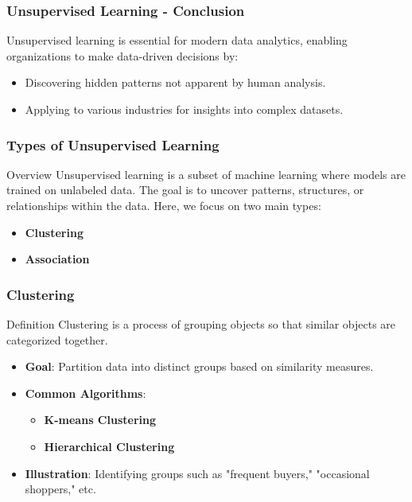 \documentclass[aspectratio=169]{beamer}
\begin{document}
\begin{frame}[fragile]
    \frametitle{Unsupervised Learning - Conclusion}
    Unsupervised learning is essential for modern data analytics, enabling organizations to make data-driven decisions by:
    \begin{itemize}
        \item Discovering hidden patterns not apparent by human analysis.
        \item Applying to various industries for insights into complex datasets.
    \end{itemize}
\end{frame}

\begin{frame}[fragile]
    \frametitle{Types of Unsupervised Learning}
    
    \begin{block}{Overview}
        Unsupervised learning is a subset of machine learning where models are trained on unlabeled data. The goal is to uncover patterns, structures, or relationships within the data. Here, we focus on two main types:
        \begin{itemize}
            \item \textbf{Clustering}
            \item \textbf{Association}
        \end{itemize}
    \end{block}
\end{frame}

\begin{frame}[fragile]
    \frametitle{Clustering}
    
    \begin{block}{Definition}
        Clustering is a process of grouping objects so that similar objects are categorized together. 
    \end{block}
    
    \begin{itemize}
        \item \textbf{Goal}: Partition data into distinct groups based on similarity measures.
        \item \textbf{Common Algorithms}:
        \begin{itemize}
            \item \textbf{K-means Clustering}
            \item \textbf{Hierarchical Clustering}
        \end{itemize}
        \item \textbf{Illustration}: Identifying groups such as "frequent buyers," "occasional shoppers," etc.
    \end{itemize}
\end{frame}
\end{document}
